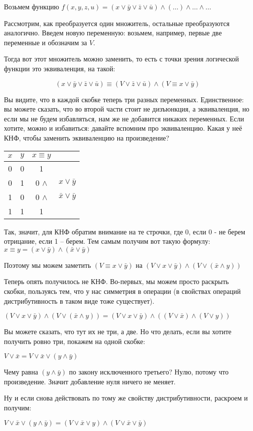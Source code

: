\documentclass[russian]{lecture-notes}
\theoremstyle{definition}
\begin{document}
		\begin{example*}
			Возьмем функцию $f(x,y,z,u) = (x \vee \bar{y} \vee \bar{z} \vee \bar{u}) \wedge (\ldots) \wedge \ldots \wedge \ldots$ 
			
			Рассмотрим, как преобразуется один множитель, остальные преобразуются аналогично. Введем новую переменную: возьмем, например, первые две переменные и обозначим за $V$.
			
			Тогда вот этот множитель можно заменить, то есть с точки зрения логической функции это эквиваленция, на такой: 
			
			\[
				(x \vee \bar{y} \vee \bar{z} \vee \bar{u}) \equiv (V \vee \bar{z} \vee \bar{u}) \wedge (V \equiv x \vee \bar{y})
			\]
			
			Вы видите, что в каждой скобке теперь три разных переменных. Единственное: вы можете сказать, что во второй части стоит не дизъюнкция, а эквиваленция, но если мы не будем избавляться, нам же не добавится никаких переменных. Если хотите, можно и избавиться: давайте вспомним про эквиваленцию. Какая у неё КНФ, чтобы заменить эквиваленцию на произведение?
			
			\begin{tabular} {c|c|c|c}
				\centering
				$x$ & $y$ & $x \equiv y$ & \\\hline
				0 & 0 & 1 & \\
				0 & 1 & 0 $\wedge$ & $x \vee \bar{y}$\\
				1 & 0 & 0 $\wedge$ & $\bar{x} \vee \bar{y}$\\
				1 & 1 & 1 & \\
			\end{tabular}
		
			Так, значит, для КНФ обратим внимание на те строчки, где 0, если 0 - не берем отрицание, если 1 – берем. Тем самым получим вот такую формулу:  $x \equiv y = (x \vee \bar{y}) \wedge (\bar{x} \vee \bar{y})$
			
			Поэтому мы можем заметить $(V \equiv x \vee \bar{y})$ на $(V \vee x \vee \bar{y}) \wedge (V \vee (\bar{x} \wedge y))$
			
			Теперь опять получилось не КНФ. Во-первых, мы можем просто  раскрыть скобки, пользуясь тем, что у нас симметрия в операции (в свойствах операций дистрибутивность в таком виде тоже существует). 
			
			$(V \vee x \vee \bar{y}) \wedge (V \vee (\bar{x} \wedge y)) = (V \vee x \vee \bar{y}) \wedge ((V \vee \bar{x}) \wedge (V \vee y))$
			
			Вы можете сказать, что тут их не три, а две. Но что делать, если вы хотите получить ровно три, покажем на одной скобке:
			
			$V \vee \bar{x} = V \vee \bar{x} \vee (y \wedge \bar{y})$
			
			Чему равна $(y \wedge \bar{y})$ по закону исключенного третьего? Нулю, потому что произведение. Значит добавление нуля ничего не меняет.
			
			Ну и если снова действовать по тому же свойству дистрибутивности, раскроем и получим:
			
			$V \vee \bar{x} \vee (y \wedge \bar{y}) = (V \vee \bar{x} \vee y) \wedge (V \vee \bar{x} \vee \bar{y})$
		\end{example*}
	
\end{document}
